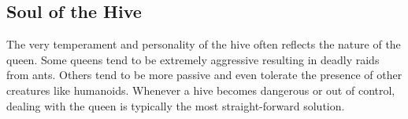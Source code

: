 \vfill\eject\vspace*{8pt}

\subsection*{Soul of the Hive}
The very temperament and personality of the hive often reflects the nature of the queen. Some queens tend to be extremely aggressive resulting in deadly raids from ants. Others tend to be more passive and even tolerate the presence of other creatures like humanoids. Whenever a hive becomes dangerous or out of control, dealing with the queen is typically the most straight-forward solution.